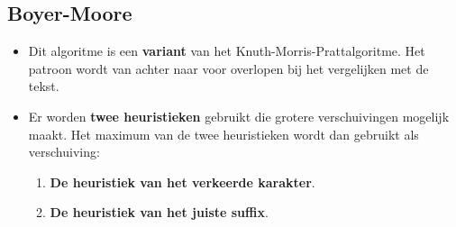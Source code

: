 \begin{itemize}
\end{itemize}


\subsection{Boyer-Moore}
\begin{itemize}
    \item Dit algoritme is een \textbf{variant} van het Knuth-Morris-Prattalgoritme.
    \alert Het patroon wordt van achter naar voor overlopen bij het vergelijken met de tekst.
    \item Er worden \textbf{twee heuristieken} gebruikt die grotere verschuivingen mogelijk maakt. Het maximum van de twee heuristieken wordt dan gebruikt als verschuiving:
    \begin{enumerate}
        \item \textbf{De heuristiek van het verkeerde karakter}.
        \item \textbf{De heuristiek van het juiste suffix}.
    \end{enumerate}
\end{itemize}

